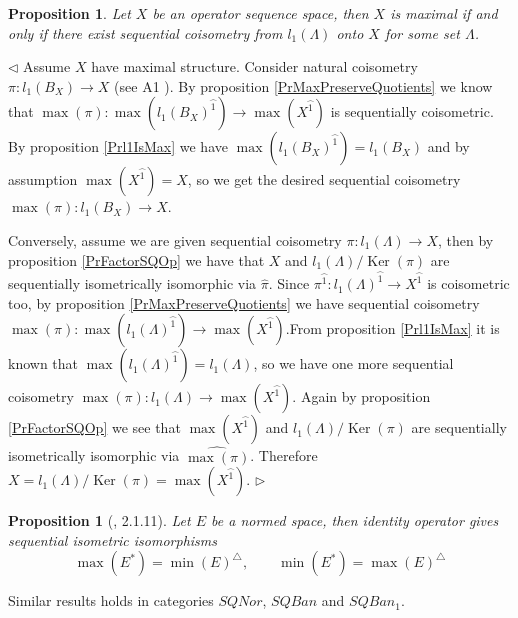 \documentclass[12pt]{article}
\newtheorem{proposition}[theorem]{Proposition}
\newenvironment{proof}{\par $\triangleleft$}{$\triangleright$}
\begin{document}
\begin{proposition}\label{PrMaxIsQuotientOfl1} Let $X$ be an operator sequence space, then $X$ is maximal if and only if there exist sequential coisometry from $l_1(\Lambda)$ onto $X$ for some set $\Lambda$.
\end{proposition}
\begin{proof} 
Assume $X$ have maximal structure. Consider natural coisometry $\pi:l_1(B_X)\to X$ (see A1 \cite{DefFloTensNorOpId}). By proposition \ref{PrMaxPreserveQuotients} we know that $\max(\pi):\max(l_1(B_X)^{\wideparen{1}})\to\max(X^{\wideparen{1}})$ is sequentially coisometric. By proposition \ref{Prl1IsMax} we have $\max(l_1(B_X)^{\wideparen{1}})=l_1(B_X)$ and by assumption $\max(X^{\wideparen{1}})=X$, so we get the desired sequential coisometry $\max(\pi):l_1(B_X)\to X$.

Conversely, assume we are given sequential coisometry $\pi:l_1(\Lambda)\to X$, then by proposition \ref{PrFactorSQOp} we have that $X$ and $l_1(\Lambda)/\operatorname{Ker}(\pi)$ are sequentially isometrically isomorphic via $\widehat{\pi}$. Since $\pi^{\wideparen{1}}:l_1(\Lambda)^{\wideparen{1}}\to X^{\wideparen{1}}$ is coisometric too, by proposition \ref{PrMaxPreserveQuotients} we have sequential coisometry $\max(\pi):\max(l_1(\Lambda)^{\wideparen{1}})\to \max(X^{\wideparen{1}})$.From proposition \ref{Prl1IsMax} it is known that $\max(l_1(\Lambda)^{\wideparen{1}})=l_1(\Lambda)$, so we have one more sequential coisometry $\max(\pi):l_1(\Lambda)\to\max(X^{\wideparen{1}})$. Again by proposition \ref{PrFactorSQOp} we see that $\max(X^{\wideparen{1}})$ and $l_1(\Lambda)/\operatorname{Ker}(\pi)$ are sequentially isometrically isomorphic via $\widehat{\max(\pi)}$. Therefore $X=l_1(\Lambda)/\operatorname{Ker}(\pi)=\max(X^{\wideparen{1}})$.
\end{proof}

\begin{proposition}[\cite{LamOpFolgen}, 2.1.11]\label{PrDualityAndMinMax}
Let $E$ be a normed space, then identity operator gives sequential isometric isomorphisms
$$
\max(E^*)=\min(E)^\triangle,
\qquad
\min(E^*)=\max(E)^\triangle
$$
\end{proposition}

Similar results holds in categories $SQNor$, $SQBan$ and $SQBan_1$.
\end{document}
